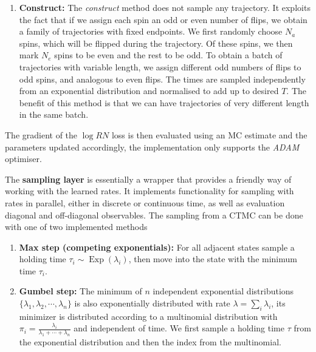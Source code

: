 \begin{enumerate}[label=\roman*)]
\begin{figure}[t!]
		\label{fig:qsampl}
	\end{figure}
	
	\item \textbf{Construct:} The \emph{construct} method does not sample any trajectory. It exploits the fact that if we assign each spin an odd or even number of flips, we obtain a family of trajectories with fixed endpoints. We first randomly choose $N_a$ spins, which will be flipped during the trajectory. Of these spins, we then mark $N_e$ spins to be even and the rest to be odd. To obtain a batch of trajectories with variable length, we assign different odd numbers of flips to odd spins, and analogous to even flips. The times are sampled independently from an exponential distribution and normalised to add up to desired $T$. The benefit of this method is that we can have trajectories of very different length in the same batch.
\end{enumerate}
The gradient of the $\log RN$ loss is then evaluated using an MC estimate and the parameters updated accordingly, the implementation only supports the \emph{ADAM} optimiser. 

The \textbf{sampling layer} is essentially a wrapper that provides a friendly way of working with the learned rates. It implements functionality for sampling with rates in parallel, either in discrete or continuous time, as well as evaluation diagonal and off-diagonal observables. The sampling from a CTMC can be done with one of two implemented methods
\begin{enumerate}[label=\roman*)]
	\item \textbf{Max step (competing exponentials):} For all adjacent states sample a holding time $\tau_i \sim \operatorname{Exp}(\lambda_i)$, then move into the state with the minimum time $\tau_i$.
	\item \textbf{Gumbel step:} The minimum of $n$ independent exponential distributions $\{\lambda_1, \lambda_2, \cdots, \lambda_n\}$ is also exponentially distributed with rate $\lambda = \sum_i \lambda_i$, its minimizer is distributed according to a multinomial distribution with $\pi_i =\frac{\lambda_{i}}{\lambda_{1}+\cdots+\lambda_{n}} $ and independent of time. We first sample a holding time $\tau$ from the exponential distribution and then the index from the multinomial.
\end{enumerate}
